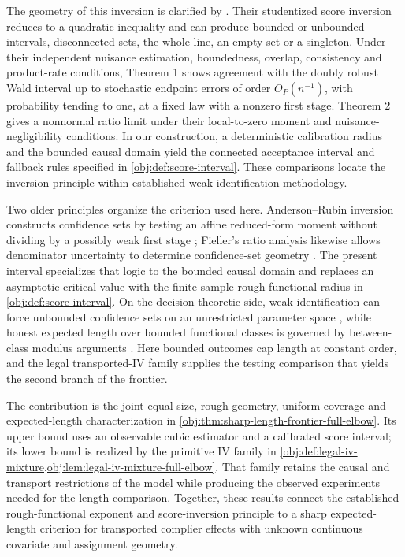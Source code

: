 The geometry of this inversion is clarified by \citet[Section 3 and Theorems 1 and 2]{SmuclerLanniMasip2025Score}. Their studentized score inversion reduces to a quadratic inequality and can produce bounded or unbounded intervals, disconnected sets, the whole line, an empty set or a singleton. Under their independent nuisance estimation, boundedness, overlap, consistency and product-rate conditions, Theorem 1 shows agreement with the doubly robust Wald interval up to stochastic endpoint errors of order \(O_P(n^{-1})\), with probability tending to one, at a fixed law with a nonzero first stage. Theorem 2 gives a nonnormal ratio limit under their local-to-zero moment and nuisance-negligibility conditions. In our construction, a deterministic calibration radius and the bounded causal domain yield the connected acceptance interval and fallback rules specified in \cref{obj:def:score-interval}. These comparisons locate the inversion principle within established weak-identification methodology.

Two older principles organize the criterion used here. Anderson--Rubin inversion constructs confidence sets by testing an affine reduced-form moment without dividing by a possibly weak first stage \citep[pp. 46--63]{Anderson1949}; Fieller's ratio analysis likewise allows denominator uncertainty to determine confidence-set geometry \citep[pp. 175--185]{Fieller1954}. The present interval specializes that logic to the bounded causal domain and replaces an asymptotic critical value with the finite-sample rough-functional radius in \cref{obj:def:score-interval}. On the decision-theoretic side, weak identification can force unbounded confidence sets on an unrestricted parameter space \citep[pp. 1365--1387]{Dufour1997}, while honest expected length over bounded functional classes is governed by between-class modulus arguments \citep[pp. 1805--1840]{CaiLow2004Adaptation}. Here bounded outcomes cap length at constant order, and the legal transported-IV family supplies the testing comparison that yields the second branch of the frontier.

The contribution is the joint equal-size, rough-geometry, uniform-coverage and expected-length characterization in \cref{obj:thm:sharp-length-frontier-full-elbow}. Its upper bound uses an observable cubic estimator and a calibrated score interval; its lower bound is realized by the primitive IV family in \cref{obj:def:legal-iv-mixture,obj:lem:legal-iv-mixture-full-elbow}. That family retains the causal and transport restrictions of the model while producing the observed experiments needed for the length comparison. Together, these results connect the established rough-functional exponent and score-inversion principle to a sharp expected-length criterion for transported complier effects with unknown continuous covariate and assignment geometry.
